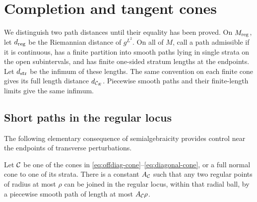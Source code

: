 \section{Completion and tangent cones}\label{sec:distances}

We distinguish two path distances until their equality has
been proved. On $M_{\mathrm{reg}}$, let $d_{\mathrm{reg}}$ be the Riemannian
distance of $g^{L^2}$. On all of $M$, call a path admissible
if it is continuous, has a finite partition into smooth paths
lying in single strata on the open subintervals, and has
finite one-sided stratum lengths at the endpoints. Let
$d_{\mathrm{str}}$ be the infimum of these lengths. The same
convention on each finite cone gives its full length distance
$d_{\mathcal C_E}$. Piecewise smooth paths and their finite-length
limits give the same infimum.

\subsection{Short paths in the regular locus}
The following elementary consequence of semialgebraicity
provides control near the endpoints of transverse perturbations.

\begin{lemma}\label{lem:short-paths}
Let $\mathcal C$ be one of the cones in
\eqref{eq:offdiag-cone}--\eqref{eq:diagonal-cone}, or a full
normal cone to one of its strata. There is a constant $A_\mathcal C$
such that any two regular points of radius at most $\rho$
can be joined in the regular locus, within that radial ball,
by a piecewise smooth path of length at most $A_\mathcal C\rho$.
\end{lemma}


